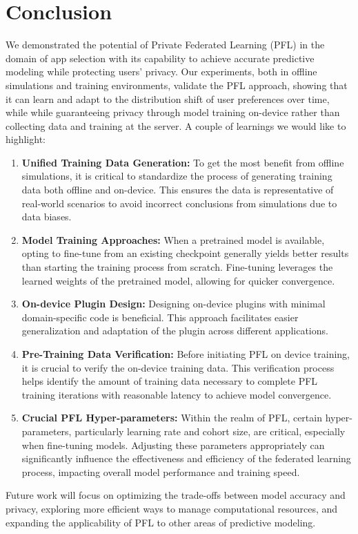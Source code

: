 \section{Conclusion}
We demonstrated the potential of Private Federated Learning (PFL) in the domain of app selection with its capability to achieve accurate predictive modeling while protecting users' privacy. Our experiments, both in offline simulations and training environments, validate the PFL approach, showing that it can learn and adapt to the distribution shift of user preferences over time, while while guaranteeing privacy through model training on-device rather than collecting data and training at the server. A couple of learnings we would like to highlight: 

\begin{enumerate}
    \item \textbf{Unified Training Data Generation:} To get the most benefit from offline simulations, it is critical to standardize the process of generating training data both offline and on-device. This ensures the data is representative of real-world scenarios to avoid incorrect conclusions from simulations due to data biases.
    \item \textbf{Model Training Approaches:} When a pretrained model is available, opting to fine-tune from an existing checkpoint generally yields better results than starting the training process from scratch. Fine-tuning leverages the learned weights of the pretrained model, allowing for quicker convergence.
    \item \textbf{On-device Plugin Design:} Designing on-device plugins with minimal domain-specific code is beneficial. This approach facilitates easier generalization and adaptation of the plugin across different applications.
    \item \textbf{Pre-Training Data Verification:} Before initiating PFL on device training, it is crucial to verify the on-device training data. This verification process helps identify the amount of training data necessary to complete PFL training iterations with reasonable latency to achieve model convergence.
    \item \textbf{Crucial PFL Hyper-parameters:} Within the realm of PFL, certain hyper-parameters, particularly learning rate and cohort size, are critical, especially when fine-tuning models. Adjusting these parameters appropriately can significantly influence the effectiveness and efficiency of the federated learning process, impacting overall model performance and training speed.
\end{enumerate}


Future work will focus on optimizing the trade-offs between model accuracy and privacy, exploring more efficient ways to manage computational resources, and expanding the applicability of PFL to other areas of predictive modeling.
